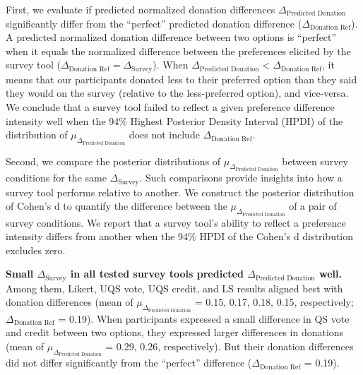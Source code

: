 First, we evaluate if predicted normalized donation differences $\Delta_{\text{Predicted Donation}}$ significantly differ from the ``perfect'' predicted donation difference ($\Delta_{\text{Donation Ref}}$). A predicted normalized donation difference between two options is ``perfect'' when it equals the normalized difference between the preferences elicited by the survey tool ($\Delta_{\text{Donation Ref}} = \Delta_{\text{Survey}}$). When $\Delta_{\text{Predicted Donation}} < \Delta_{\text{Donation Ref}}$, it means that our participants donated less to their preferred option than they said they would on the survey (relative to the less-preferred option), and vice-versa. We conclude that a survey tool failed to reflect a given preference difference intensity well when the 94\% Highest Posterior Density Interval (HPDI) of the distribution of $\mu_{\Delta_{\text{Predicted Donation}}}$ does not include $\Delta_{\text{Donation Ref}}$. 

Second, we compare the posterior distributions of $\mu_{\Delta_{\text{Predicted Donation}}}$ between survey conditions for the same $\Delta_{\text{Survey}}$. Such comparisons provide insights into how a survey tool performs relative to another. We construct the posterior distribution of Cohen's d to quantify the difference between the $\mu_{\Delta_{\text{Predicted Donation}}}$ of a pair of survey conditions. We report that a survey tool's ability to reflect a preference intensity differs from another when the 94\% HPDI of the Cohen's d distribution excludes zero. 

\textbf{Small $\Delta_{\text{Survey}}$ in all tested survey tools predicted $\Delta_{\text{Predicted Donation}}$ well.} Among them, Likert, UQS vote, UQS credit, and LS results aligned best with donation differences (mean of $\mu_{\Delta_{\text{Predicted Donation}}}$ = 0.15, 0.17, 0.18, 0.15, respectively; $\Delta_{\text{Donation Ref}}$ = 0.19). When participants expressed a small difference in QS vote and credit between two options, they expressed larger differences in donations (mean of $\mu_{\Delta_{\text{Predicted Donation}}}$ = 0.29, 0.26, respectively). But their donation differences did not differ significantly from the ``perfect'' difference ($\Delta_{\text{Donation Ref}}$ = 0.19).

